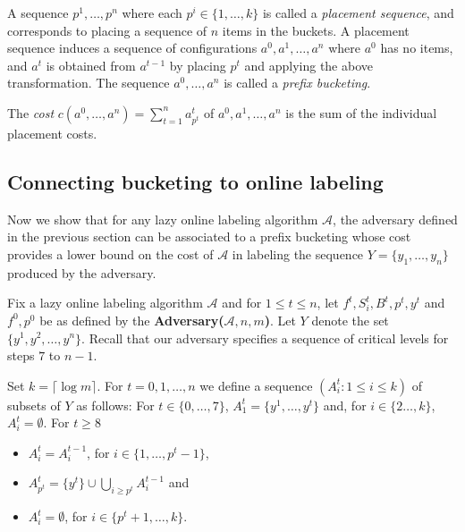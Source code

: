 \documentclass[unicode,review]{siamart1116}
\newcommand{\A}{\mathcal{A}}
\newcommand{\natInt}[2]{ \left\{ #1, \dotsc, #2 \right\} }
\numberwithin{theorem}{section}
\begin{document}
A sequence $p^1,\ldots,p^n$ where each $p^i \in \{1,\ldots,k\}$ is called a {\em placement sequence}, and  corresponds
to placing a sequence of $n$ items in the buckets.  
A placement sequence induces a sequence of configurations
$a^0,a^1,\dotsc,a^n$ where $a^0$ has no items,
and $a^t$ is obtained from $a^{t-1}$ by placing $p^t$ and
applying the above transformation.
The sequence
$a^0,\ldots,a^n$ is called a {\em prefix bucketing}.
\iffalse
satisfying: $a^0 = (0,0,\dotsc,0)$ and for $t=1,2,\dotsc,n$, there exists $p^{t} \in \natInt{1}{k}$ such that
\begin{enumerate}
\item $a^t_i = a^{t-1}_i$, for all $i=1,2,\dotsc,p^{t}-1$,
\item $a^t_{p^{t}} = 1+ \sum_{i\ge p^{t}} a^{t-1}_i$, and
\item $a^t_i = 0$, for all $i=p^{t}+1,\dotsc,k$.
\end{enumerate}
\fi
The \emph{cost} $c(a^0,\dotsc,a^n)=
\sum_{t=1}^n a^t_{p^{t}}$ of $a^0,a^1,\dotsc,a^n$ is the sum of the individual placement costs. 

\subsection{Connecting bucketing to online labeling}
\label{ss-b to ol}

Now we show that for any lazy online labeling algorithm $\A$, the adversary
defined in the previous section can be associated  to a prefix bucketing whose cost provides a lower bound
on the cost of $\A$ in labeling the sequence $Y=\{y_1,\ldots,y_n\}$ produced by the adversary. 

Fix a lazy online labeling algorithm $\A$ and for $1 \leq t \leq n$, let $f^t,S^t_i,B^t,p^{t},y^t$ and $f^0,p^0$ be as
defined by the {\bf Adversary($\A,n,m$)}. Let $Y$ denote the set $\{y^1,y^2,\dotsc,y^n\}$.
Recall that our adversary specifies a sequence of critical levels for steps $7$ to $n-1$.

Set $k=\lceil \log m\rceil$.
For $t=0,1,\dotsc,n$ we define a sequence $(A^t_i:1 \leq i \leq k)$ of subsets of $Y$
as follows:
For $t \in \{0,\ldots,7\}$,
$A^t_1=\{y^1,\ldots,y^t\}$ and,   
for $i \in \{2\dotsc,k\}$, $A^t_i = \emptyset$.  For $t\geq 8$
\begin{itemize}
\item $A^t_i = A^{t-1}_i$, for  $i \in \{1,\dotsc,p^{t}-1\}$,
\item $A^t_{p^{t}} = \{y^t\} \cup \bigcup_{i\ge p^{t}} A^{t-1}_i$ and
\item $A^t_i = \emptyset$, for  $i \in \{p^{t}+1,\dotsc, k\}$.
\end{itemize}
\end{document}
